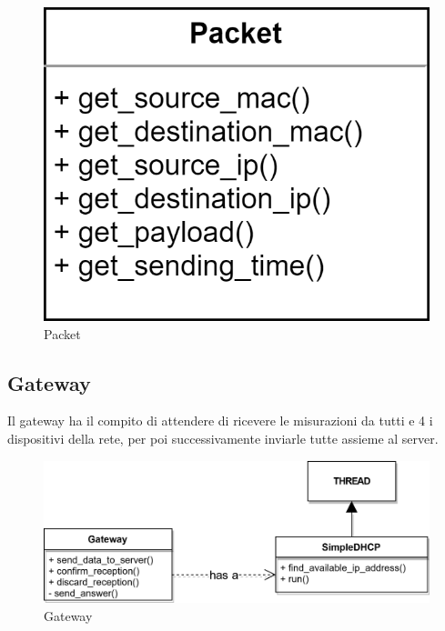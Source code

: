 \documentclass[a4paper,12pt]{report}
\begin{document}
\begin{figure}[H]
    \begin{center}
        \centering
        \includegraphics[scale=1]{UML/Packet.png}
    \end{center}
    \caption{Packet}
    \label{img:Packet}
\end{figure}

\subsection*{Gateway}
Il gateway ha il compito di attendere di ricevere le misurazioni da tutti e 4 i dispositivi della rete, per poi successivamente inviarle tutte assieme al server.  
\begin{figure}[H]
    \begin{center}
        \centering
        \includegraphics[scale=1]{UML/Gateway.png}
    \end{center}
    \caption{Gateway}
    \label{img:Gateway}
\end{figure}
\
\\
%
\clearpage
\end{document}
